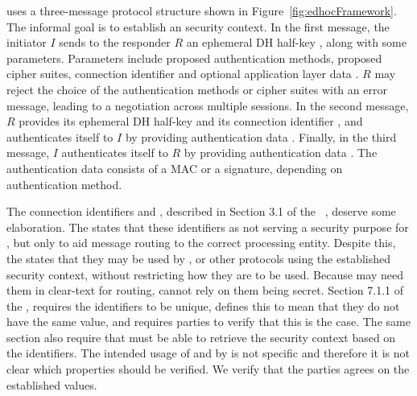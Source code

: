
%
\mEdhoc{} uses a three-message protocol structure
shown in Figure~\ref{fig:edhocFramework}.
%
The informal goal is to establish an \mOscore{} security context.
%
In the first message, the initiator $I$ sends to the responder $R$ an
ephemeral DH half-key \mGx{}, along with some parameters.
%
Parameters include proposed \mEdhoc{} authentication methods, proposed cipher
suites, connection identifier \mCi{} and optional application layer data \mADone.
%
$R$ may reject the choice of the authentication methods
or cipher suites with an error message, leading to a negotiation across
multiple \mEdhoc{} sessions.
%
In the second message, $R$ provides its ephemeral
DH half-key \mGy{} and its connection identifier \mCr, and authenticates itself
to $I$ by providing authentication data \mAuthr{}.
%
Finally, in the third message, $I$ authenticates itself
to $R$ by providing authentication data \mAuthi{}.
%
The authentication data consists of a MAC or a signature, depending on
authentication method.
%

The connection identifiers \mCi{} and \mCr{}, described in Section 3.1 of the
\mSpec{}~\cite{our-analysis-selander-lake-edhoc-01}, deserve some elaboration.
%
The \mSpec{} states that these identifiers as not serving a security purpose for
\mEdhoc{}, but only to aid message routing to the correct \mEdhoc{} processing
entity.
%
Despite this, the \mSpec{} states that they may be used by \mOscore{}, or other
protocols using the established security context, without restricting how they
are to be used.
%
Because \mEdhoc{} may need them in clear-text for routing, \mOscore{} cannot
rely on them being secret.
%
Section 7.1.1 of the \mSpec{}, requires the identifiers to be unique,
defines this to mean that they do not have the same value, and requires parties
to verify that this is the case.
%
The same section also require that \mOscore{} must be able to retrieve the
security context based on the identifiers.
%
The intended usage of \mCi{} and \mCr{} by \mOscore{} is not specific and
therefore it is not clear which properties should be verified.
%
We verify that the parties agrees on the established values.
%

